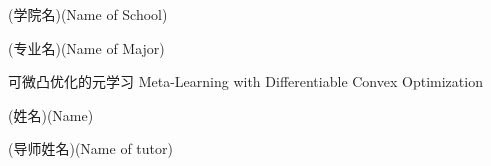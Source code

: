 
\school
{(学院名)}{(Name of School)}

\major
{(专业名)}{(Name of Major)}

\thesistitle
{可微凸优化的元学习}
{}
{Meta-Learning with Differentiable Convex Optimization}
{}

\thesisauthor
{(姓名)}{(Name)}

\teacher
{(导师姓名)}{(Name of tutor)}






